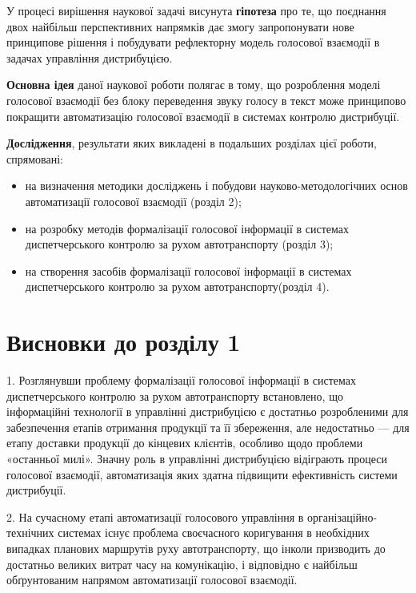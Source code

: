 У процесі вирішення наукової задачі висунута \textbf{гіпотеза} про те, що поєднання двох найбільш перспективних напрямків дає змогу запропонувати нове принципове рішення і побудувати рефлекторну модель голосової взаємодії в задачах управління дистрибуцією.


\textbf{Основна ідея} даної наукової роботи полягає в тому, що розроблення моделі голосової взаємодії без блоку переведення звуку голосу в текст може принципово покращити автоматизацію голосової взаємодії в системах контролю дистрибуції.

\textbf{Дослідження}, результати яких викладені в подальших розділах цієї роботи, спрямовані:

\begin{itemize}
	\item на визначення методики досліджень і побудови науково-методологічних основ автоматизації голосової взаємодії (розділ 2);
	\item на розробку методів формалізації голосової інформації в системах диспетчерського контролю за рухом автотранспорту (розділ 3);
	\item на створення засобів формалізації голосової інформації в системах диспетчерського контролю за рухом автотранспорту(розділ 4).
\end{itemize}

\section*{Висновки до розділу 1}

1. Розглянувши проблему формалізації голосової інформації в системах диспетчерського контролю за рухом автотранспорту встановлено, що інформаційні технології в управлінні дистрибуцією є достатньо розробленими для забезпечення етапів отримання продукції та її збереження, але недостатньо --- для етапу доставки продукції до кінцевих клієнтів, особливо щодо проблеми «останньої милі». Значну роль в управлінні дистрибуцією відіграють процеси голосової взаємодії, автоматизація яких здатна підвищити ефективність системи дистрибуції.

2. На сучасному етапі автоматизації голосового управління в організаційно-технічних системах існує проблема своєчасного коригування в необхідних випадках планових маршрутів руху автотранспорту, що інколи призводить до достатньо великих витрат часу на комунікацію, і відповідно є найбільш обґрунтованим напрямом автоматизації голосової взаємодії.

